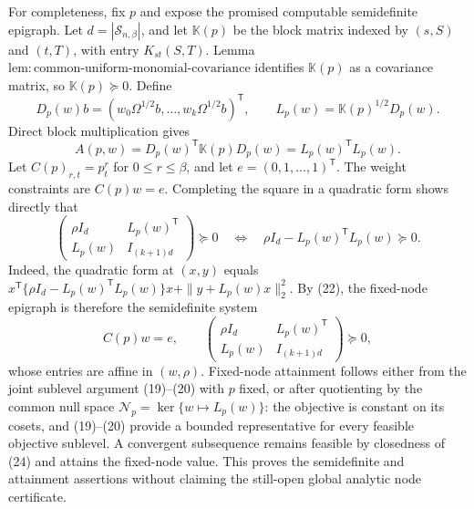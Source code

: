 For completeness, fix \(p\) and expose the promised computable semidefinite epigraph.  Let \(d=|\mathcal S_{n,\beta}|\), and let \(\mathbb K(p)\) be the block matrix indexed by \((s,S)\) and \((t,T)\), with entry \(K_{st}(S,T)\).  Lemma~\(\mathrm{lem{:}common\text{-}uniform\text{-}monomial\text{-}covariance}\) identifies \(\mathbb K(p)\) as a covariance matrix, so \(\mathbb K(p)\succeq0\).  Define
\[
D_p(w)b=(w_0\Omega^{1/2}b,\ldots,w_k\Omega^{1/2}b)^{\mathsf T},
\qquad
L_p(w)=\mathbb K(p)^{1/2}D_p(w).
\]
Direct block multiplication gives
\[
A(p,w)=D_p(w)^{\mathsf T}\mathbb K(p)D_p(w)
=L_p(w)^{\mathsf T}L_p(w).
\tag{22}
\]
Let \(C(p)_{r,t}=p_t^r\) for \(0\le r\le\beta\), and let \(e=(0,1,\ldots,1)^{\mathsf T}\).  The weight constraints are \(C(p)w=e\).  Completing the square in a quadratic form shows directly that
\[
\begin{pmatrix}
\rho I_d&L_p(w)^{\mathsf T}\\
L_p(w)&I_{(k+1)d}
\end{pmatrix}\succeq0
\quad\Longleftrightarrow\quad
\rho I_d-L_p(w)^{\mathsf T}L_p(w)\succeq0.
\tag{23}
\]
Indeed, the quadratic form at \((x,y)\) equals
\(x^{\mathsf T}\{\rho I_d-L_p(w)^{\mathsf T}L_p(w)\}x+
\|y+L_p(w)x\|_2^2\).  By (22), the fixed-node epigraph is therefore the semidefinite system
\[
C(p)w=e,
\qquad
\begin{pmatrix}
\rho I_d&L_p(w)^{\mathsf T}\\
L_p(w)&I_{(k+1)d}
\end{pmatrix}\succeq0,
\tag{24}
\]
whose entries are affine in \((w,\rho)\).  Fixed-node attainment follows either from the joint sublevel argument (19)--(20) with \(p\) fixed, or after quotienting by the common null space \(\mathcal N_p=\ker\{w\mapsto L_p(w)\}\): the objective is constant on its cosets, and (19)--(20) provide a bounded representative for every feasible objective sublevel.  A convergent subsequence remains feasible by closedness of (24) and attains the fixed-node value.  This proves the semidefinite and attainment assertions without claiming the still-open global analytic node certificate.